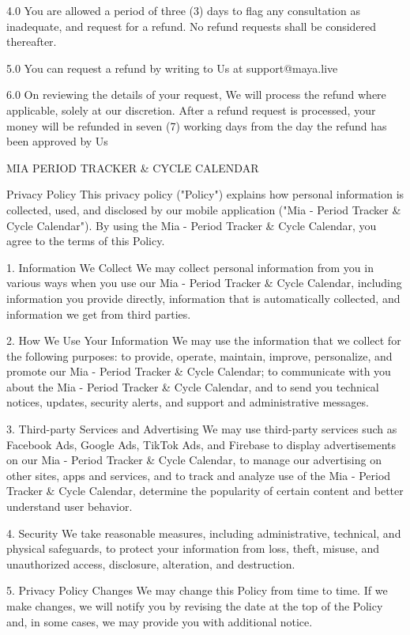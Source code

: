 4.0     You are allowed a period of three (3) days to flag any consultation as inadequate, and request for a refund. No refund requests shall be considered thereafter.

5.0     You can request a refund by writing to Us at support@maya.live

6.0     On reviewing the details of your request, We will process the refund where applicable, solely at our discretion. After a refund request is processed, your money will be refunded in seven (7) working days from the day the refund has been approved by Us


MIA PERIOD TRACKER & CYCLE CALENDAR

Privacy Policy
This privacy policy ("Policy") explains how personal information is collected, used, and disclosed by our mobile application ("Mia - Period Tracker & Cycle Calendar"). By using the Mia - Period Tracker & Cycle Calendar, you agree to the terms of this Policy.

1. Information We Collect
We may collect personal information from you in various ways when you use our Mia - Period Tracker & Cycle Calendar, including information you provide directly, information that is automatically collected, and information we get from third parties.

2. How We Use Your Information
We may use the information that we collect for the following purposes: to provide, operate, maintain, improve, personalize, and promote our Mia - Period Tracker & Cycle Calendar; to communicate with you about the Mia - Period Tracker & Cycle Calendar, and to send you technical notices, updates, security alerts, and support and administrative messages.

3. Third-party Services and Advertising
We may use third-party services such as Facebook Ads, Google Ads, TikTok Ads, and Firebase to display advertisements on our Mia - Period Tracker & Cycle Calendar, to manage our advertising on other sites, apps and services, and to track and analyze use of the Mia - Period Tracker & Cycle Calendar, determine the popularity of certain content and better understand user behavior.

4. Security
We take reasonable measures, including administrative, technical, and physical safeguards, to protect your information from loss, theft, misuse, and unauthorized access, disclosure, alteration, and destruction.

5. Privacy Policy Changes
We may change this Policy from time to time. If we make changes, we will notify you by revising the date at the top of the Policy and, in some cases, we may provide you with additional notice.

